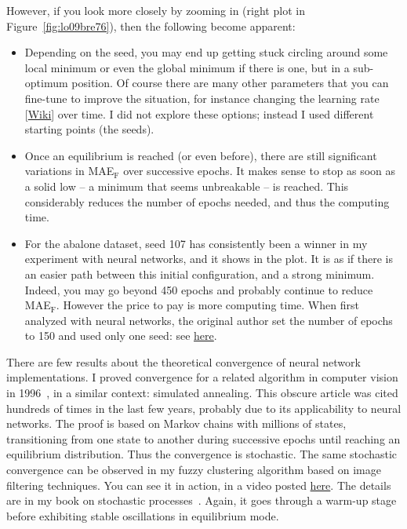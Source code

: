 \documentclass[oneside,10pt]{book}
\begin{document}
\noindent However, if you look more closely by zooming in (right plot in Figure~\ref{fig:lo09bre76}), then the following become apparent: \vspace{1ex}
\begin{itemize}
\item Depending on the seed, you may end up getting stuck circling around some local minimum or even the global minimum if there is one, but in a sub-optimum position.
Of course there are many other parameters that you can fine-tune to improve the situation, for instance
 changing the \textcolor{index}{learning rate} [\href{https://en.wikipedia.org/wiki/Learning_rate}{Wiki}] over time. I did not explore these options; instead I used different starting points (the seeds).
\item Once an equilibrium is reached (or even before), there are still significant variations in MAE$_{\text{F}}$ over successive epochs. It makes sense to stop as soon as a solid low -- a minimum that seems unbreakable -- is reached. This considerably reduces the number of epochs needed, and thus the computing time.
\item For the abalone dataset, seed 107 has consistently been a winner in my experiment with neural networks, and it shows in the plot. It is as if there is an easier path between this
 initial configuration, and a strong minimum. Indeed, you may go beyond 450 epochs and probably continue to reduce MAE$_{\text{F}}$. However the price to pay is more computing time. When first analyzed with neural networks, the original author set the number of epochs to 150 and used only one seed:
see \href{https://machinelearningmastery.com/neural-network-models-for-combined-classification-and-regression/}{here}.
\end{itemize}\vspace{1ex}
There are few results about the theoretical convergence of neural network implementations. I proved convergence for a related algorithm in computer vision in 1996~\cite{vgieee}, in a similar context: simulated annealing. This obscure article was cited hundreds of times in the last few years, probably due to its applicability
 to neural networks. The proof is based on Markov chains with millions of states, transitioning from one state to another during successive epochs until reaching an equilibrium distribution.
 Thus the convergence is stochastic. The same stochastic convergence can be observed in my fuzzy clustering algorithm based on image filtering techniques.
 You can see it in action, in a video posted \href{https://www.youtube.com/shorts/MKpQimCFfHA}{here}. The details are in my book on
stochastic processes~\cite{vgsimulnew}. Again, it goes through a warm-up stage before exhibiting stable oscillations in equilibrium mode.
\end{document}
